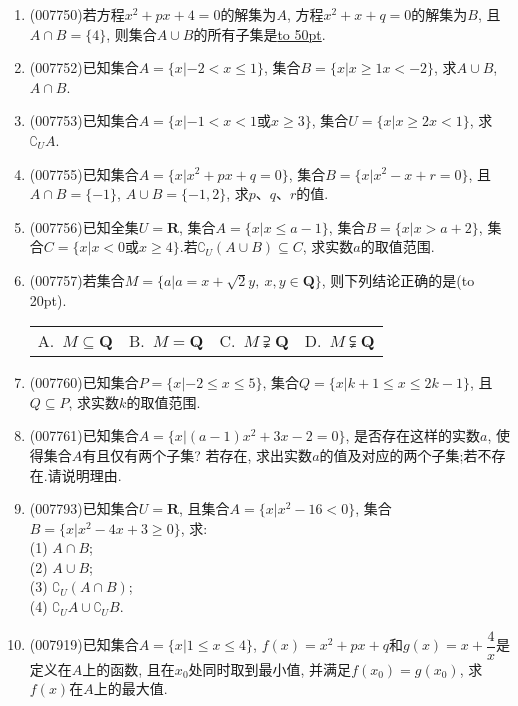 \documentclass[10pt,a4paper]{article}
\newcommand{\blank}[1]{\underline{\hbox to #1pt{}}}
\newcommand{\bracket}[1]{(\hbox to #1pt{})}
\newcommand{\fourch}[4]{\par\begin{tabular}{p{.23\textwidth}p{.23\textwidth}p{.23\textwidth}p{.23\textwidth}}
A.~#1 &B.~#2& C.~#3& D.~#4
\end{tabular}}
\begin{document}
\begin{enumerate}[1.]
\begin{center}
\end{center}
\fourch{$(M\cap P)\cap S$}{$(M\cap P)\cup S$}{$(M\cap P)\cap \complement _IS$}{$(M\cap P)\cup \complement _IS$}
\item {\tiny (007750)}若方程$x^2+px+4=0$的解集为$A$, 方程$x^2+x+q=0$的解集为$B$, 且$A\cap B=\{4\}$, 则集合$A\cup B$的所有子集是\blank{50}.
\item {\tiny (007752)}已知集合$A=\{x|-2<x\le 1\}$, 集合$B=\{x|x\ge 1x<-2\}$, 求$A\cup B$, $A\cap B$.
\item {\tiny (007753)}已知集合$A=\{x|-1<x<1$或$x\ge 3\}$, 集合$U=\{x|x\ge 2x<1\}$, 求$\complement _UA$.
\item {\tiny (007755)}已知集合$A=\{x|x^2+px+q=0\}$, 集合$B=\{x|x^2-x+r=0\}$, 且$A\cap B=\{-1\}$, $A\cup B=\{-1,2\}$, 求$p$、$q$、$r$的值.
\item {\tiny (007756)}已知全集$U=\mathbf{R}$, 集合$A=\{x|x\le a-1\}$, 集合$B=\{x|x>a+2\}$, 集合$C=\{x|x<0$或$x\ge 4\}$.若$\complement _U(A\cup B)\subseteq C$, 求实数$a$的取值范围.
\item {\tiny (007757)}若集合$M=\{a|a=x+\sqrt 2y,\ x,y\in \mathbf{Q}\}$, 则下列结论正确的是\bracket{20}.
\fourch{$M\subseteq \mathbf{Q}$}{$M=\mathbf{Q}$}{$M\supsetneqq \mathbf{Q}$}{$M\subsetneqq \mathbf{Q}$}
\item {\tiny (007760)}已知集合$P=\{x|-2\le x\le 5\}$, 集合$Q=\{x|k+1\le x\le 2k-1\}$, 且$Q\subseteq P$, 求实数$k$的取值范围.
\item {\tiny (007761)}已知集合$A=\{x|(a-1)x^2+3x-2=0\}$, 是否存在这样的实数$a$, 使得集合$A$有且仅有两个子集? 若存在, 求出实数$a$的值及对应的两个子集;若不存在.请说明理由.
\item {\tiny (007793)}已知集合$U=\mathbf{R}$, 且集合$A=\{x|x^2-16<0\}$, 集合$B=\{x|x^2-4x+3\ge 0\}$, 求:\\
(1) $A\cap B$;\\
(2) $A\cup B$;\\
(3) $\complement _U(A\cap B)$;\\
(4) $\complement _UA\cup \complement _UB$.
\item {\tiny (007919)}已知集合$A=\{x|1\le x\le 4\}$, $f(x)=x^2+px+q$和$g(x)=x+\dfrac 4x$是定义在$A$上的函数, 且在$x_0$处同时取到最小值, 并满足$f(x_0)=g(x_0)$, 求$f(x)$在$A$上的最大值.

\end{enumerate}
\end{document}
